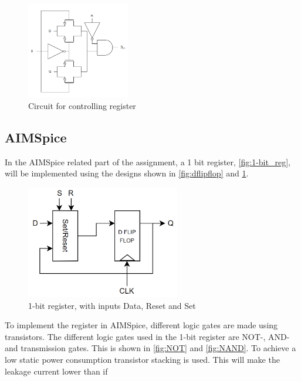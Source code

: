\begin{figure}[H]
    \centering
    \includegraphics[width=0.4\textwidth]{Figures/setReset.png}
    \caption{Circuit for controlling register}
    \label{fig:setreset}
\end{figure}



\subsection{AIMSpice}
\label{subsec:aimspicemethod}
In the AIMSpice related part of the assignment, a 1 bit register, \autoref{fig:1-bit_reg}, will be implemented using the designs shown in \autoref{fig:dflipflop} and \ref{fig:setreset}.

\begin{figure}[H]
    \centering
    \includegraphics[width=0.6\textwidth]{Figures/1-bit register.png}
    \caption{1-bit register, with inputs Data, Reset and Set}
    \label{fig:1-bit_reg}
\end{figure}

To implement the register in AIMSpice, different logic gates are made using transistors. The different logic gates used in the 1-bit register are NOT-, AND- and transmission gates. This is shown in \autoref{fig:NOT} and \ref{fig:NAND}. To achieve a low static power consumption transistor stacking is used. This will make the leakage current lower than if  

